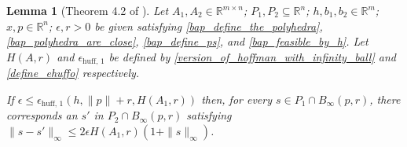 \documentclass{article}
\newtheorem{lemma}[theorem]{Lemma}
\theoremstyle{case}
\numberwithin{theorem}{subsection}
\newcommand{\ehuffo}{{\epsilon_{\textrm{huff, 1}}}}
\newcommand{\bpr}{{B_{\infty}\left(p, r\right)}}
\newcommand{\Rm}{\mathbb R^m}
\newcommand{\Rn}{\mathbb R^n}
\begin{document}
% 

% 



\begin{lemma}[Theorem 4.2 of \cite{perturbations_of_linear_inequalities}]
\label{4_2}
Let 
$A_1, A_2 \in \mathbb R ^ {m \times n}$;
$P_1, P_2 \subseteq \Rn$;
$h, b_1, b_2 \in \Rm$;
$\hat x, p \in \Rn$;
$\epsilon, r > 0$
be given satisfying
\cref{bap_define_the_polyhedra}, \cref{bap_polyhedra_are_close}, \cref{bap_define_ps}, and \cref{bap_feasible_by_h}.
Let $H\left(A, r\right)$ and $\ehuffo$ be defined by \cref{version_of_hoffman_with_infinity_ball} and \cref{define_ehuffo} respectively.


If
$\epsilon \le \ehuffo \left(h, \|p\| + r, H\left(A_1, r\right)\right)$
then, for every $s \in P_1 \cap \bpr$,
there corresponds an $s'$ in $P_2 \cap \bpr$ satisfying 
$\|s - s'\|_{\infty}\le 2\epsilon H\left(A_1, r\right)\left(1 + \|s\|_{\infty}\right)$.
\end{lemma}
\end{document}
